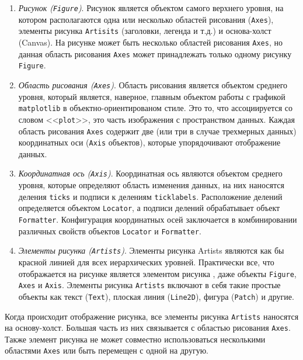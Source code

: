 \begin{enumerate}[label=\arabic*)]
	\item  \textit{Рисунок (\lstinline!Figure!)}. Рисунок является объектом самого верхнего уровня, на котором располагаются одна или несколько областей рисования (\lstinline!Axes!), элементы рисунка \lstinline!Artisits! (заголовки, легенда и т.д.) и основа-холст (Canvas). На рисунке может быть несколько областей рисования \lstinline!Axes!, но данная область рисования \lstinline!Axes! может принадлежать только одному рисунку \lstinline!Figure!.
	\item  \textit{Область рисования (\lstinline!Axes!)}. Область рисования является объектом среднего уровня, который является, наверное, главным объектом работы с графикой \lstinline!matplotlib! в объектно-ориентированом стиле. Это то, что ассоциируется со словом <<\lstinline!plot!>>, это часть изображения с пространством данных. Каждая область рисования \lstinline!Axes! содержит две (или три в случае трехмерных данных) координатных оси (\lstinline!Axis! объектов), которые упорядочивают отображение данных.
	\item  \textit{Координатная ось (\lstinline!Axis!)}. Координатная ось являются объектом среднего уровня, которые определяют область изменения данных, на них наносятся деления \lstinline!ticks! и подписи к делениям \lstinline!ticklabels!. Расположение делений определяется объектом \lstinline!Locator!, а подписи делений обрабатывает объект \lstinline!Formatter!. Конфигурация координатных осей заключается в комбинировании различных свойств объектов \lstinline!Locator! и \lstinline!Formatter!.
	\item  \textit{Элементы рисунка (\lstinline!Artists!)}. Элементы рисунка Artists являются как бы красной линией для всех иерархических уровней. Практически все, что отображается на рисунке является элементом рисунка , даже объекты \lstinline!Figure!, \lstinline!Axes! и \lstinline!Axis!. Элементы рисунка \lstinline!Artists! включают в себя такие простые объекты как текст (\lstinline!Text!), плоская линия (\lstinline!Line2D!), фигура (\lstinline!Patch!) и другие.
\end{enumerate}

Когда происходит отображение рисунка, все элементы рисунка \lstinline!Artists! наносятся на основу-холст. Большая часть из них связывается с областью рисования \lstinline!Axes!. Также элемент рисунка не может совместно использоваться несколькими областями \lstinline!Axes! или быть перемещен с одной на другую.

